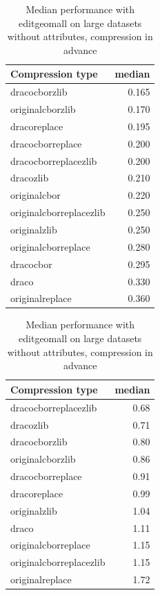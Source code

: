   \begin{table}[!h]
    \begin{minipage}{.5\linewidth}
      \caption{
Median performance with editgeomall on large datasets, compression in advance}
\centering

\begin{tabular}{|l|r|}
\hline
Compression type & median\\
\hline
dracocborzlib & 0.165\\
\hline
originalcborzlib & 0.170\\
\hline
dracoreplace & 0.195\\
\hline
dracocborreplace & 0.200\\
\hline
dracocborreplacezlib & 0.200\\
\hline
dracozlib & 0.210\\
\hline
originalcbor & 0.220\\
\hline
originalcborreplacezlib & 0.250\\
\hline
originalzlib & 0.250\\
\hline
originalcborreplace & 0.280\\
\hline
dracocbor & 0.295\\
\hline
draco & 0.330\\
\hline
originalreplace & 0.360\\
\hline
\end{tabular}
\end{minipage}%
    \begin{minipage}{.5\linewidth}
      \centering
        \caption{
Median performance with editgeomall on large datasets without attributes, compression in advance}

\begin{tabular}{|l|r|}
\hline
Compression type & median\\
\hline
dracocborreplacezlib & 0.68\\
\hline
dracozlib & 0.71\\
\hline
dracocborzlib & 0.80\\
\hline
originalcborzlib & 0.86\\
\hline
dracocborreplace & 0.91\\
\hline
dracoreplace & 0.99\\
\hline
originalzlib & 1.04\\
\hline
draco & 1.11\\
\hline
originalcborreplace & 1.15\\
\hline
originalcborreplacezlib & 1.15\\
\hline
originalreplace & 1.72\\
\hline
\end{tabular}
\end{minipage} 
\end{table}
